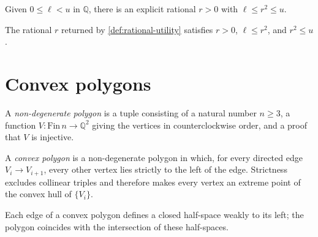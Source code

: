 \begin{definition}
  \label{def:rational-utility}
  \leanok
  Given $0 \le \ell < u$ in $\mathbb{Q}$, there is an explicit rational
  $r > 0$ with $\ell \le r^2 \le u$.
\end{definition}

\begin{lemma}
  \label{lem:findRationalWithSquareBetween}
  \leanok
  The rational $r$ returned by \ref{def:rational-utility} satisfies $r > 0$,
  $\ell \le r^2$, and $r^2 \le u$.
\end{lemma}

\chapter{Convex polygons}

\begin{definition}
  \label{def:nondegen-polygon}
  \leanok
  A \emph{non-degenerate polygon} is a tuple consisting of a natural number
  $n \ge 3$, a function $V : \mathrm{Fin}\,n \to \mathbb{Q}^2$ giving the
  vertices in counterclockwise order, and a proof that $V$ is injective.
\end{definition}

\begin{definition}
  \label{def:convex-polygon}
  \leanok
  A \emph{convex polygon} is a non-degenerate polygon in which, for every
  directed edge $V_i \to V_{i+1}$, every other vertex lies strictly to the
  left of the edge. Strictness excludes collinear triples and therefore
  makes every vertex an extreme point of the convex hull of $\{V_i\}$.
\end{definition}

\begin{definition}
  \label{def:toHalfSpaces}
  \leanok
  Each edge of a convex polygon defines a closed half-space weakly to its
  left; the polygon coincides with the intersection of these half-spaces.
\end{definition}

